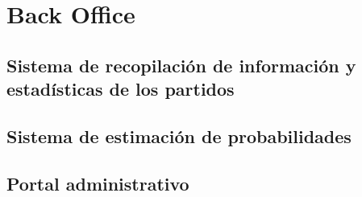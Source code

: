 \chapter{Back Office}
\section{Sistema de recopilación de información y estadísticas de los partidos}
\section{Sistema de estimación de probabilidades}
\section{Portal administrativo}

